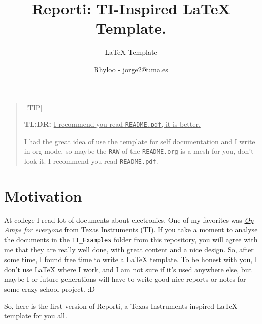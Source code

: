 \documentclass[english]{reporti}
\date{}
\title{Reporti: TI-Inspired \LaTeX{} Template.}
\begin{document}
\subtitle{LaTeX Template}
\author{Rhyloo - \href{mailto:jorge2@uma.es}{jorge2@uma.es}}




\cover[width=1.35\textwidth][next]

\begin{quote}
[!TIP]

\textbf{TL;DR:} \uline{I recommend you read \texttt{README.pdf}, it is better.}

I had the great idea of use the template for self documentation and I write in org-mode, so maybe the \texttt{RAW} of the \texttt{README.org} is a mesh for you, don't look it.  I recommend you read \texttt{README.pdf}.
\end{quote}

\section{Motivation}
\label{sec:org0a6710a}
At college I read lot of documents about electronics. One of my favorites was \emph{\href{https://e2echina.ti.com/cfs-file/\_\_key/telligent-evolution-components-attachments/00-52-01-00-00-04-59-46/OP-amp-for-everyone.pdf}{Op Amps for everyone}} from Texas Instruments (TI). If you take a moment to analyse the documents in the \texttt{TI\_Examples} folder from this repository, you will agree with me that they are really well done, with great content and a nice design. So, after some time, I found free time to write a \LaTeX{} template. To be honest with you, I don't use \LaTeX{} where I work, and I am not sure if it's used anywhere else, but maybe I or future generations will have to write good nice reports or notes for some crazy school project. :D

So, here is the first version of Reporti, a Texas Instruments-inspired \LaTeX{} template for you all.
\end{document}
